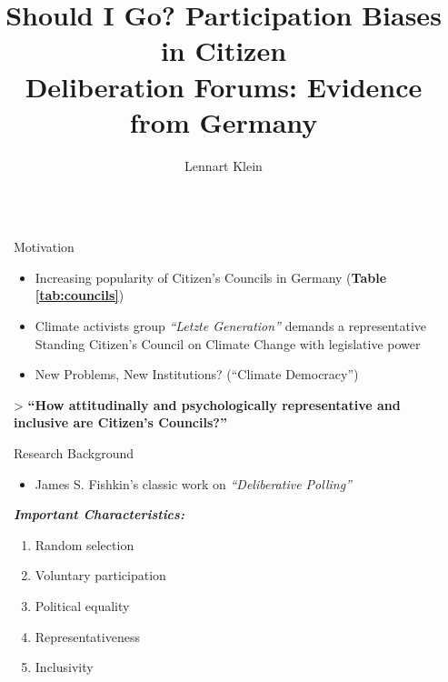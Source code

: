 \documentclass[final]{beamer}
\title{Should I Go? Participation Biases in  Citizen\\Deliberation Forums: Evidence from Germany}
\author{Lennart Klein \inst{1}}
\institute[shortinst]{\inst{1} University of Tübingen}
\newlength{\sepwidth}
\newlength{\colwidth}
\newcommand{\separatorcolumn}{\begin{column}{\sepwidth}\end{column}}
\begin{document}
\begin{frame}[t]
\begin{columns}[t]
\separatorcolumn

\begin{column}{\colwidth}

  \begin{block}{Motivation}

  \begin{itemize}
        \item Increasing popularity of Citizen's Councils in Germany (\textbf{Table \ref{tab:councils}})
      \item Climate activists group \textit{``Letzte Generation''} demands a representative Standing Citizen's Council on Climate Change with legislative power
      \item New Problems, New Institutions? (``Climate Democracy'')
  \end{itemize}

  \vspace{1ex}
  > \textbf{``How attitudinally and psychologically representative and inclusive are Citizen's Councils?''}        
  \vspace{2ex}


  
  \end{block}

  \begin{block}{Research Background}


    \begin{itemize}
        \item James S. Fishkin's \citeyearpar{fishkin1991DemocracyDeliberation} classic work on \textit{``Deliberative Polling''}
    \end{itemize}
    
    \textit{\textbf{Important Characteristics:}}
        \begin{enumerate}
            \item Random selection
            \item Voluntary participation
            \item Political equality
            \item Representativeness
            \item Inclusivity
        \end{enumerate}


\end{block}
\end{column}
\end{columns}
\end{frame}
\end{document}
